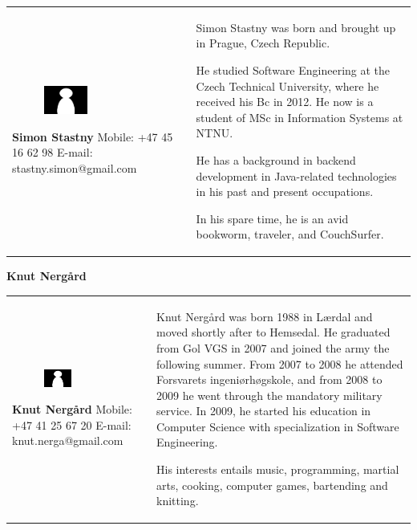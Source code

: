 \documentclass[11pt]{book}
\begin{document}
\begin{table}[H]
\centering
\begin{tabular}{ p{7cm} p{7cm} }
\parbox{7cm}{
\begin{figure}[H]
      \includegraphics[width=0.4\textwidth]{Figures/Person.png}
      \label{fig:partners_group_simon}
\end{figure}
\textbf{Simon Stastny}\\
Mobile: +47 45 16 62 98\\
E-mail: stastny.simon@gmail.com} & \parbox{7cm}{
	
Simon Stastny was born and brought up in Prague, Czech Republic.

He studied Software Engineering at the Czech Technical University, where he received his Bc in 2012. He now is a student of MSc in Information Systems at NTNU.

He has a background in backend development in Java-related technologies in his past and present occupations.

In his spare time, he is an avid bookworm, traveler, and CouchSurfer.

}
\end{tabular}
\label{tab:partners_group_simon}
\end{table}

\textbf{Knut Nergård}
\begin{table}[H]
\centering
\begin{tabular}{ p{7cm} p{7cm} }
\parbox{7cm}{
\begin{figure}[H]
      \includegraphics[width=0.4\textwidth]{Figures/Person.png}
      \label{fig:partners_group_knut}
\end{figure}
\textbf{Knut Nergård}\\
Mobile: +47 41 25 67 20\\
E-mail: knut.nerga@gmail.com} & \parbox{7cm}{
Knut Nergård was born 1988 in Lærdal and moved shortly after to Hemsedal. He graduated from Gol VGS in 2007 and joined the army the following summer. From 2007 to 2008 he attended Forsvarets ingeniørhøgskole, and from 2008 to 2009 he went through the mandatory military service. In 2009, he started his education in Computer Science with specialization in Software Engineering. 

His interests entails music, programming, martial arts, cooking, computer games, bartending and knitting.
}
\end{tabular}
\label{tab:partners_group_knut}
\end{table}
\end{document}
